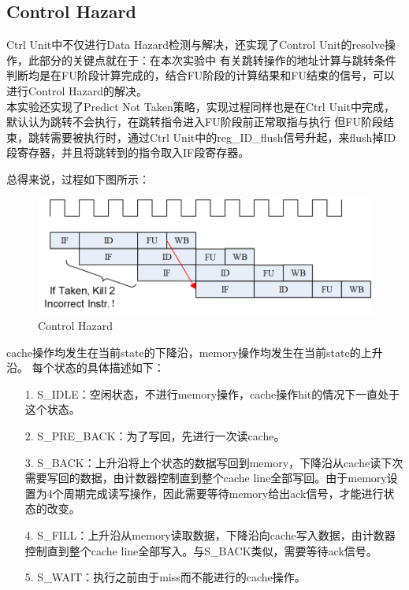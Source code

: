 \subsection{Control Hazard}
Ctrl Unit中不仅进行Data Hazard检测与解决，还实现了Control Unit的resolve操作，此部分的关键点就在于：在本次实验中
有关跳转操作的地址计算与跳转条件判断均是在FU阶段计算完成的，结合FU阶段的计算结果和FU结束的信号，可以进行Control Hazard的解决。\\

本实验还实现了Predict Not Taken策略，实现过程同样也是在Ctrl Unit中完成，默认认为跳转不会执行，在跳转指令进入FU阶段前正常取指与执行
但FU阶段结束，跳转需要被执行时，通过Ctrl Unit中的reg\_ID\_flush信号升起，来flush掉ID段寄存器，并且将跳转到的指令取入IF段寄存器。

总得来说，过程如下图所示：

\begin{figure}[H] %
	\centering %
	\includegraphics[width=1.0\textwidth]{figs/Branch.png} %
	\caption{Control Hazard} %
	\label{Fig.3} %
\end{figure}

cache操作均发生在当前state的下降沿，memory操作均发生在当前state的上升沿。 每个状态的具体描述如下：
\begin{itemize}
	\item [1.] S\_IDLE：空闲状态，不进行memory操作，cache操作hit的情况下一直处于这个状态。
	\item [2.] S\_PRE\_BACK：为了写回，先进行一次读cache。
	\item [3.] S\_BACK：上升沿将上个状态的数据写回到memory，下降沿从cache读下次需要写回的数据，由计数器控制直到整个cache line全部写回。由于memory设置为4个周期完成读写操作，因此需要等待memory给出ack信号，才能进行状态的改变。
	\item [4.] S\_FILL：上升沿从memory读取数据，下降沿向cache写入数据，由计数器控制直到整个cache line全部写入。与S\_BACK类似，需要等待ack信号。
	\item [5.] S\_WAIT：执行之前由于miss而不能进行的cache操作。
\end{itemize}
